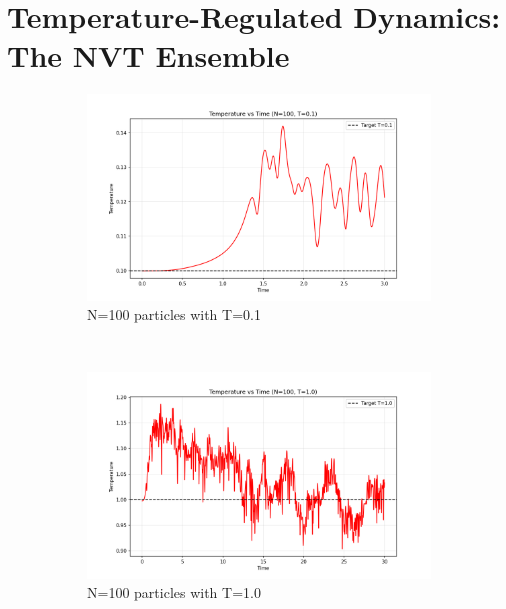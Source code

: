 \section{Temperature-Regulated Dynamics: The NVT Ensemble}
\begin{figure}[H]
	\centering
	\begin{subfigure}{0.5\textwidth}
		\includegraphics[width=\textwidth]{media/temp_N100_T0.1.png}
		\caption{N=100 particles with T=0.1}
		\label{sfig:nvt_temp_N100_T01}
	\end{subfigure}%
	~
	\begin{subfigure}{0.5\textwidth}
		\includegraphics[width=\textwidth]{media/temp_N100_T1.0.png}
		\caption{N=100 particles with T=1.0}
		\label{sfig:nvt_temp_N100_T10}
	\end{subfigure}%
	\\
	\begin{subfigure}{0.5\textwidth}

\end{subfigure}
\end{figure}
